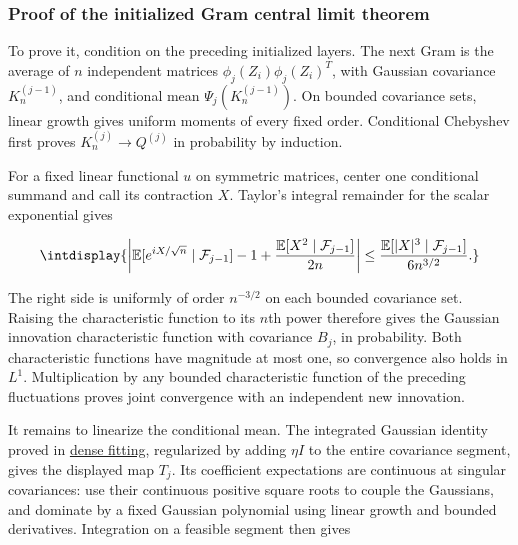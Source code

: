 \subsubsection{Proof of the initialized Gram central limit theorem}



To prove it, condition on the preceding initialized layers. The next Gram is the average of \(n\) independent matrices \(\phi_j(Z_i)\phi_j(Z_i)^T\), with Gaussian covariance \(K_n^{(j-1)}\), and conditional mean \(\Psi_j(K_n^{(j-1)})\). On bounded covariance sets, linear growth gives uniform moments of every fixed order. Conditional Chebyshev first proves \(K_n^{(j)}\to Q^{(j)}\) in probability by induction.



For a fixed linear functional \(u\) on symmetric matrices, center one conditional summand and call its contraction \(X\). Taylor's integral remainder for the scalar exponential gives


\begingroup\renewcommand{\theHequation}{intdisplay.482}
\begin{equation*}
\intdisplay{
\left|\mathbb E[e^{iX/\sqrt n}\mid\mathcal F_{j-1}]
-1+\frac{\mathbb E[X^2\mid\mathcal F_{j-1}]}{2n}\right|
\le\frac{\mathbb E[|X|^3\mid\mathcal F_{j-1}]}{6n^{3/2}}.
}
\end{equation*}
\endgroup


The right side is uniformly of order \(n^{-3/2}\) on each bounded covariance set. Raising the characteristic function to its \(n\)th power therefore gives the Gaussian innovation characteristic function with covariance \(B_j\), in probability. Both characteristic functions have magnitude at most one, so convergence also holds in \(L^1\). Multiplication by any bounded characteristic function of the preceding fluctuations proves joint convergence with an independent new innovation.



It remains to linearize the conditional mean. The integrated Gaussian identity proved in \hyperref[int:dense-fitting]{dense fitting}, regularized by adding \(\eta I\) to the entire covariance segment, gives the displayed map \(T_j\). Its coefficient expectations are continuous at singular covariances: use their continuous positive square roots to couple the Gaussians, and dominate by a fixed Gaussian polynomial using linear growth and bounded derivatives. Integration on a feasible segment then gives


